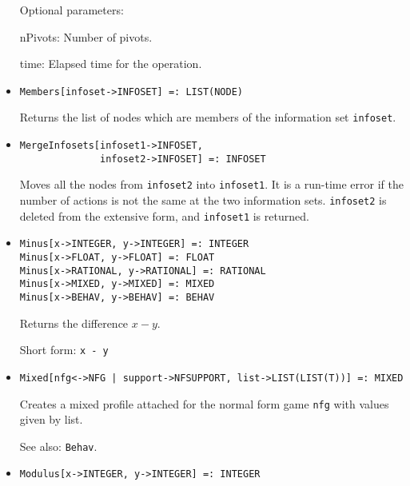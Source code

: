 \begin{itemize}
\item
[Optional parameters:]\hfil\null

\bd
\item[nPivots:] Number of pivots. 
\item[time:] Elapsed time for the operation.
\ed
\ed


\item
\protect \large \begin{verbatim}
Members[infoset->INFOSET] =: LIST(NODE)
\end{verbatim}\normalsize

\bd
Returns the list of nodes which are members of the information
set \verb+infoset+.
\ed

\item
\protect \large \begin{verbatim}
MergeInfosets[infoset1->INFOSET,
              infoset2->INFOSET] =: INFOSET
\end{verbatim}\normalsize

\bd
Moves all the nodes from \verb+infoset2+ into \verb+infoset1+.
It is a run-time error if the number of actions is not the same at the
two information sets.  \verb+infoset2+ is deleted from the extensive form,
and \verb+infoset1+ is returned.
\ed

\item 
\protect \large \begin{verbatim}
Minus[x->INTEGER, y->INTEGER] =: INTEGER
Minus[x->FLOAT, y->FLOAT] =: FLOAT
Minus[x->RATIONAL, y->RATIONAL] =: RATIONAL
Minus[x->MIXED, y->MIXED] =: MIXED
Minus[x->BEHAV, y->BEHAV] =: BEHAV
\end{verbatim} \normalsize

\bd
Returns the difference $x - y$.
\item
[Short form:] \verb+x - y+
\ed


\item
\protect \large \begin{verbatim}
Mixed[nfg<->NFG | support->NFSUPPORT, list->LIST(LIST(T))] =: MIXED
\end{verbatim}\normalsize

\bd
Creates a mixed profile attached for the normal form game \verb+nfg+
with values given by list.  
\item
[See also:] {\tt Behav}.
\ed


\item
\protect \large \begin{verbatim}
Modulus[x->INTEGER, y->INTEGER] =: INTEGER
\end{verbatim}\normalsize


\end{itemize}
